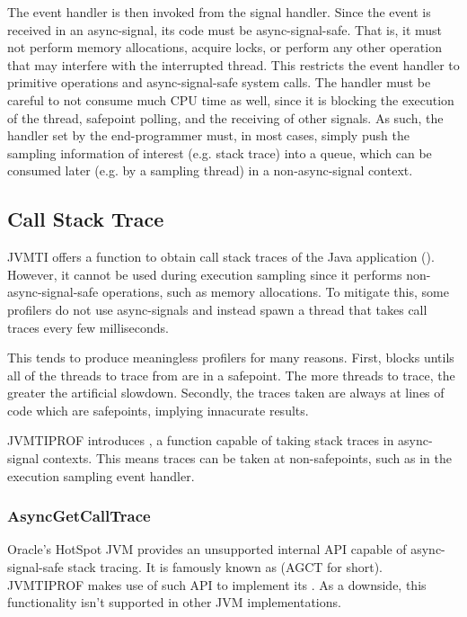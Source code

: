The event handler is then invoked from the signal handler. Since the event is received in an async-signal, its code must be async-signal-safe. That is, it must not perform memory allocations, acquire locks, or perform any other operation that may interfere with the interrupted thread. This restricts the event handler to primitive operations and async-signal-safe system calls. The handler must be careful to not consume much CPU time as well, since it is blocking the execution of the thread, safepoint polling, and the receiving of other signals. As such, the handler set by the end-programmer must, in most cases, simply push the sampling information of interest (e.g. stack trace) into a queue, which can be consumed later (e.g. by a sampling thread) in a non-async-signal context.


\subsection{Call Stack Trace} \label{sec:impl_callstacktrace}

JVMTI offers a function to obtain call stack traces of the Java application (). However, it cannot be used during execution sampling since it performs non-async-signal-safe operations, such as memory allocations. To mitigate this, some profilers do not use async-signals and instead spawn a thread that takes call traces every few milliseconds.

This tends to produce meaningless profilers for many reasons. First,  blocks untils all of the threads to trace from are in a safepoint. The more threads to trace, the greater the artificial slowdown. Secondly, the traces taken are always at lines of code which are safepoints, implying innacurate results.

JVMTIPROF introduces , a function capable of taking stack traces in async-signal contexts. This means traces can be taken at non-safepoints, such as in the execution sampling event handler.

\subsubsection*{AsyncGetCallTrace}

Oracle's HotSpot JVM provides an unsupported internal API capable of async-signal-safe stack tracing. It is famously known as  (AGCT for short). JVMTIPROF makes use of such API to implement its . As a downside, this functionality isn't supported in other JVM implementations.

